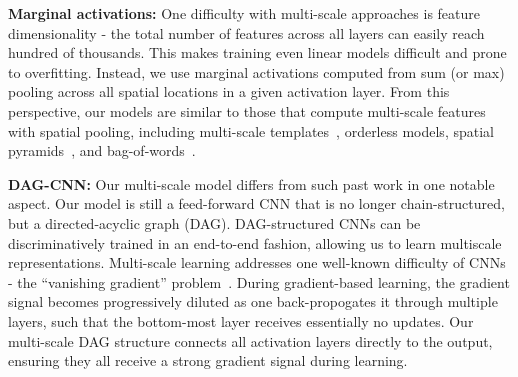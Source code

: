 \documentclass[10pt,twocolumn,letterpaper]{article}
\begin{document}
{\bf Marginal activations:} One difficulty with multi-scale approaches is feature dimensionality - the total number of features across all layers can easily reach hundred of thousands. This makes training even linear models difficult and prone to overfitting. Instead, we use marginal activations computed from sum (or max) pooling across all spatial locations in a given activation layer. From this perspective, our models are similar to those that compute multi-scale features with spatial pooling, including multi-scale templates~\cite{felzenszwalb2008discriminatively}, orderless models\cite{Gong14}, spatial pyramids~\cite{spatial_pyramid}, and bag-of-words~\cite{sivic2003video}.

{\bf DAG-CNN:} Our multi-scale model differs from such past work in one notable aspect. Our model is still a feed-forward CNN that is no longer chain-structured, but a directed-acyclic graph (DAG). DAG-structured CNNs can be discriminatively trained in an end-to-end fashion, allowing us to learn multiscale representations. Multi-scale learning addresses one well-known difficulty of CNNs - the ``vanishing gradient'' problem~\cite{bengio1994learning}. During gradient-based learning, the gradient signal becomes progressively diluted as one back-propogates it through multiple layers, such that the bottom-most layer receives essentially no updates. Our multi-scale DAG structure connects all activation layers directly to the output, ensuring they all receive a strong gradient signal during learning. 


\end{document}
